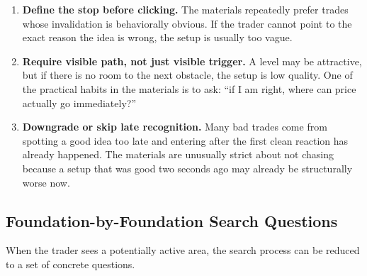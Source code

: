 \begin{enumerate}
  \item \textbf{Define the stop before clicking.}
  The materials repeatedly prefer trades whose invalidation is behaviorally obvious.
  If the trader cannot point to the exact reason the idea is wrong, the setup is usually too vague.

  \item \textbf{Require visible path, not just visible trigger.}
  A level may be attractive, but if there is no room to the next obstacle, the setup is low quality.
  One of the practical habits in the materials is to ask: ``if I am right, where can price actually go immediately?''

  \item \textbf{Downgrade or skip late recognition.}
  Many bad trades come from spotting a good idea too late and entering after the first clean reaction has already happened.
  The materials are unusually strict about not chasing because a setup that was good two seconds ago may already be structurally worse now.
\end{enumerate}

\subsection{Foundation-by-Foundation Search Questions}

When the trader sees a potentially active area, the search process can be reduced to a set of concrete questions.

